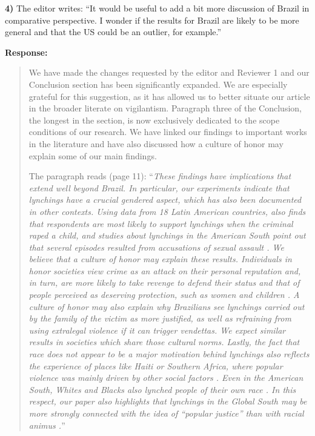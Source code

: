 \documentclass[a4paper,12pt]{article}
\begin{document}
\vspace{.3cm}

\noindent \textbf{4)} The editor writes: ``It would be useful to add a bit more
discussion of Brazil in comparative perspective. I wonder if the results for
Brazil are likely to be more general and that the US could be an outlier, for
example.''

\vspace{.3cm}

\noindent \textbf{Response:} 
\begin{quote}

We have made the changes requested by the editor and Reviewer 1 and our
Conclusion section has been significantly expanded. We are especially grateful
for this suggestion, as it has allowed us to better situate our article in the
broader literate on vigilantism. Paragraph three of the Conclusion, the longest
in the section, is now exclusively dedicated to the scope conditions of our
research. We have linked our findings to important works in the literature and
have also discussed how a culture of honor may explain some of our main
findings. 

The paragraph reads (page 11): ``\textit{These findings have implications that
  extend well beyond Brazil. In particular, our experiments indicate that
  lynchings have a crucial gendered aspect, which has also been documented in
  other contexts. Using data from 18 Latin American countries,
  \citet{nivette2016institutional} also finds that respondents are most likely
  to support lynchings when the criminal raped a child, and studies about
  lynchings in the American South point out that several episodes resulted from
  accusations of sexual assault \citep{jacquet2013giles, smaangs2020race}. We
  believe that a culture of honor may explain these results. Individuals in
  honor societies view crime as an attack on their personal reputation and, in
  turn, are more likely to take revenge to defend their status and that of
  people perceived as deserving protection, such as women and children
  \citep{nisbett2018culture}. A culture of honor may also explain why
  Brazilians see lynchings carried out by the family of the victim as more
  justified, as well as refraining from using extralegal violence if it can
  trigger vendettas. We expect similar results in societies which share those
  cultural norms. Lastly, the fact that race does not appear to be a major
  motivation behind lynchings also reflects the experience of places like Haiti
  or Southern Africa, where popular violence was mainly driven by other social
  factors \citep{berg2011globalizing, jung2020lynching}. Even in the American
  South, Whites and Blacks also lynched people of their own race
  \citep{beck1997race}. In this respect, our paper also highlights that
lynchings in the Global South may be more strongly connected with the idea of
``popular justice'' than with racial animus \citep{martins2015linchamentos}.}''

\end{quote}
\end{document}

